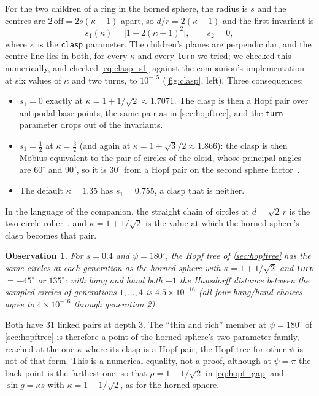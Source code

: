 \documentclass[11pt,a4paper]{article}
\newtheorem{observation}{Observation}
\theoremstyle{remark}
\newcommand{\code}[1]{\texttt{#1}}
\begin{document}
For the two children of a ring in the horned sphere, the radius is $s$ and the centres are $2\,\mathrm{off}=2s(\kappa-1)$ apart, so $d/r=2(\kappa-1)$ and the first invariant is
\begin{equation}
s_1(\kappa)=\bigl|1-2(\kappa-1)^2\bigr|,\qquad s_2=0,
\label{eq:clasp_s1}
\end{equation}
where $\kappa$ is the \code{clasp} parameter.  The children's planes are perpendicular, and the centre line lies in both, for every $\kappa$ and every \code{turn} we tried; we checked this numerically, and checked \cref{eq:clasp_s1} against the companion's implementation at six values of $\kappa$ and two turns, to $10^{-15}$ (\cref{fig:clasp}, left).  Three consequences:

\begin{itemize}[leftmargin=*,itemsep=2pt]
\item $s_1=0$ exactly at $\kappa=1+1/\sqrt2\approx1.7071$.  The clasp is then a Hopf pair over antipodal base points, the same pair as in \cref{sec:hopftree}, and the \code{turn} parameter drops out of the invariants.
\item $s_1=\tfrac12$ at $\kappa=\tfrac32$ (and again at $\kappa=1+\sqrt3/2\approx1.866$): the clasp is then M\"obius-equivalent to the pair of circles of the oloid, whose principal angles are $60^\circ$ and $90^\circ$, so it is $30^\circ$ from a Hopf pair on the second sphere factor~\cite{wiki_oloid}.
\item The default $\kappa=1.35$ has $s_1=0.755$, a clasp that is neither.
\end{itemize}
In the language of the companion, the straight chain of circles at $d=\sqrt2\,r$ is the two-circle roller~\cite{wiki_oloid}, and $\kappa=1+1/\sqrt2$ is the value at which the horned sphere's clasp becomes that pair.

\begin{observation}\label{obs:hopf_is_horned}
For $s=0.4$ and $\psi=180^\circ$, the Hopf tree of \cref{sec:hopftree} has the same circles at each generation as the horned sphere with $\kappa=1+1/\sqrt2$ and \code{turn}$=-45^\circ$ or $135^\circ$: with hang and hand both $+1$ the Hausdorff distance between the sampled circles of generations $1,\dots,4$ is $4.5\times10^{-16}$ (all four hang/hand choices agree to $4\times10^{-16}$ through generation 2).
\end{observation}
Both have 31 linked pairs at depth 3.  The ``thin and rich'' member at $\psi=180^\circ$ of \cref{sec:hopftree} is therefore a point of the horned sphere's two-parameter family, reached at the one $\kappa$ where its clasp is a Hopf pair; the Hopf tree for other $\psi$ is not of that form.  This is a numerical equality, not a proof, although at $\psi=\pi$ the back point is the farthest one, so that $\rho=1+1/\sqrt2$ in \cref{eq:hopf_gap} and $\sin g=\kappa s$ with $\kappa=1+1/\sqrt2$, as for the horned sphere.
\end{document}
